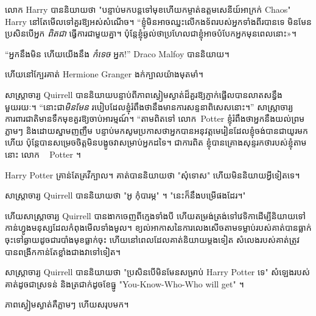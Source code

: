 លោក Harry បាននិយាយថា "បន្ទាប់មកបន្តទៅមុខហើយកម្ចាត់ឧត្តមសេនីយ៍អាក្រក់ Chaos" Harry នៅតែមើលទៅគួរឱ្យអស់សំណើច។ “ខ្ញុំមិនអាចឈ្នះលើកងទ័ពរបស់អ្នកទាំងពីរបានទេ មិនមែនប្រសិនបើអ្នក \emph{ពិតជា} ធ្វើការជាមួយគ្នា។ ប៉ុន្តែ​ខ្ញុំ​ឆ្ងល់​ថា​ប្រហែល​ជា​ខ្ញុំ​អាច​បំបែក​អ្នក​មុន​ពេល​នោះ»។

“អ្នកនឹងមិន ហើយយើងនឹង \emph{កំទេច} អ្នក!” Draco Malfoy បាននិយាយ។

ហើយនៅក្បែរគាត់ Hermione Granger ងក់ក្បាលយ៉ាងមុតមាំ។

សាស្ត្រាចារ្យ Quirrell បាននិយាយបន្ទាប់ពីភាពស្ងៀមស្ងាត់ដ៏គួរឱ្យភ្ញាក់ផ្អើលបានលាតសន្ធឹងមួយរយៈ។ “នោះជា\emph{មិនមែន} របៀបដែលខ្ញុំរំពឹងថានឹងមានការសន្ទនាពិសេសនោះ។” សាស្ត្រាចារ្យការពារជាតិមានទឹកមុខគួរឱ្យចាប់អារម្មណ៍។ “តាមពិតទៅ លោក~Potter ខ្ញុំរំពឹងថាអ្នកនឹងយល់ព្រមភ្លាមៗ និងដោយស្នាមញញឹម បន្ទាប់មកសូមប្រកាសថាអ្នកបានអនុវត្តមេរៀនដែលខ្ញុំចង់បានជាយូរមកហើយ ប៉ុន្តែបានសម្រេចចិត្តមិនបង្ខូចវាសម្រាប់អ្នកដទៃ។ ជាការពិត ខ្ញុំបានគ្រោងសុន្ទរកថារបស់ខ្ញុំតាមនោះ លោក ~ Potter ។

Harry Potter គ្រាន់តែគ្រវីក្បាល។ គាត់បាននិយាយថា "សុំទោស" ហើយមិននិយាយអ្វីទៀតទេ។

សាស្រ្តាចារ្យ Quirrell បាននិយាយថា "អូ កុំបារម្ភ" ។ "នេះក៏នឹងបម្រើផងដែរ។"

ហើយសាស្រ្តាចារ្យ Quirrell បានងាកចេញពីក្មេងទាំងបី ហើយតម្រង់ត្រង់ទៅវេទិកាដើម្បីនិយាយទៅកាន់ហ្វូងមនុស្សដែលកំពុងមើលទាំងមូល។ ខ្យល់អាកាសនៃការលេងសើចតាមទម្លាប់របស់គាត់បានធ្លាក់ចុះទៅឆ្ងាយដូចជារបាំងមុខធ្លាក់ចុះ ហើយនៅពេលដែលគាត់និយាយម្តងទៀត សំលេងរបស់គាត់ត្រូវបានពង្រីកកាន់តែខ្លាំងជាងវាទៅទៀត។

សាស្ត្រាចារ្យ Quirrell បាននិយាយថា "ប្រសិនបើមិនមែនសម្រាប់ Harry Potter ទេ" សំឡេងរបស់គាត់ដូចជាស្រទន់ និងត្រជាក់ដូចខែធ្នូ "You-Know-Who-Who will get" ។

ភាពស្ងៀមស្ងាត់គឺភ្លាមៗ ហើយសរុបមក។

\later

